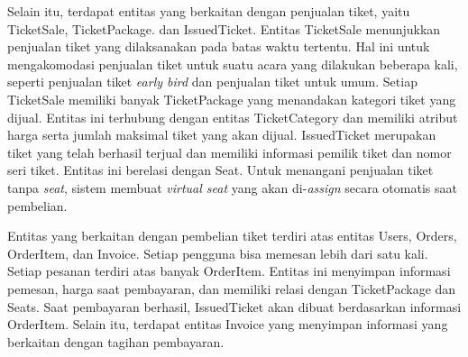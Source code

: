 Selain itu, terdapat entitas yang berkaitan dengan penjualan tiket, yaitu TicketSale, TicketPackage. dan IssuedTicket. Entitas TicketSale menunjukkan penjualan tiket yang dilaksanakan pada batas waktu tertentu. Hal ini untuk mengakomodasi penjualan tiket untuk suatu acara yang dilakukan beberapa kali, seperti penjualan tiket \textit{early bird} dan penjualan tiket untuk umum. Setiap TicketSale memiliki banyak TicketPackage yang menandakan kategori tiket yang dijual. Entitas ini terhubung dengan entitas TicketCategory dan memiliki atribut harga serta jumlah maksimal tiket yang akan dijual. IssuedTicket merupakan tiket yang telah berhasil terjual dan memiliki informasi pemilik tiket dan nomor seri tiket. Entitas ini berelasi dengan Seat. Untuk menangani penjualan tiket tanpa \textit{seat}, sistem membuat \textit{virtual seat} yang akan di-\textit{assign} secara otomatis saat pembelian.

Entitas yang berkaitan dengan pembelian tiket terdiri atas entitas Users, Orders, OrderItem, dan Invoice. Setiap pengguna bisa memesan lebih dari satu kali. Setiap pesanan terdiri atas banyak OrderItem. Entitas ini menyimpan informasi pemesan, harga saat pembayaran, dan memiliki relasi dengan TicketPackage dan Seats. Saat pembayaran berhasil, IssuedTicket akan dibuat berdasarkan informasi OrderItem. Selain itu, terdapat entitas Invoice yang menyimpan informasi yang berkaitan dengan tagihan pembayaran.